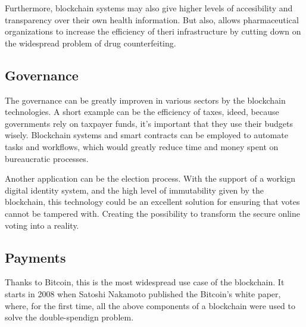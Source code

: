 Furthermore, blockchain systems may also give higher levels of accesibility and 
transparency over their own health information. But also, allows pharmaceutical 
organizations to increase the efficiency of theri infrastructure by cutting 
down on the widespread problem of drug counterfeiting.\cite{binancevision}

\subsection{Governance}
\label{sec:governance}

The governance can be greatly improven in various sectors by the blockchain technologies.
A short example can be the efficiency of taxes, ideed, because governments rely on 
taxpayer funds, it's important that they use their budgets wisely. Blockchain systems 
and smart contracts can be employed to automate tasks and workflows, which would 
greatly reduce time and money spent on bureaucratic processes.\cite{binancevision}

Another application can be the election process. With the support of a workign digital 
identity system, and the high level of immutability given by the blockchain, this 
technology could be an excellent solution for ensuring that votes cannot be tampered with.
Creating the possibility to transform the secure online voting into a reality. 

\subsection{Payments}
\label{sec:payments}

Thanks to Bitcoin, this is the most widespread use case of the blockchain. It starts in 
2008 when Satoshi Nakamoto published the Bitcoin's white paper, where, for the first time, 
all the above components of a blockchain were used to solve the double-spendign problem.\pagebreak


